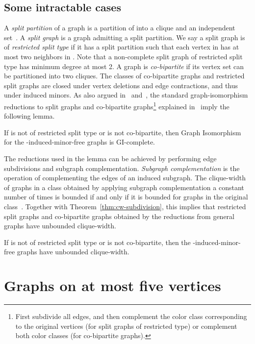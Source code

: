 \documentclass[envcountsame,envcountsect,11pt,a4paper]{llncs}
\begin{document}
\subsection{Some intractable cases}\label{subsec:intractable:cases}
A \emph{split partition}  of a graph 
is a partition of  into a clique  and an independent set~. A \emph{split graph} is a graph admitting a split partition.
We say a split graph is of \emph{restricted split type} if it has a split partition 
such that each vertex in  has at most two neighbors in .
Note that a non-complete split graph of restricted split type has minimum degree at most 2.
A graph is \emph{co-bipartite} if its vertex set can be partitioned into two cliques.
The classes of co-bipartite graphs and restricted split graphs are closed under vertex deletions and edge contractions, and thus under induced minors.
As also argued in~\cite{Ponomarenko88} and~\cite{DBLP:conf/wg/KratschS12},
the standard graph-isomorphism reductions to split graphs and co-bipartite graphs\footnote{First subdivide all edges, and then complement the color class corresponding to the original vertices (for split graphs of restricted type)
or complement both color classes (for co-bipartite graphs).}
explained in~\cite{BoothColbourn1979} imply the following lemma.
\begin{lemma}
\label{lem:type1split_cobipartite}
If  is not of restricted split type or  is not co-bipartite,
then {\sc Graph Isomorphism} for the -induced-minor-free graphs is GI-complete.
\end{lemma}
The reductions used in the lemma can be achieved by performing edge subdivisions and subgraph complementation.
\emph{Subgraph complementation} is the operation of complementing the edges of an induced subgraph.
The clique-width of graphs in a class obtained by applying subgraph complementation a constant number of times
is bounded if and only if it is bounded for graphs in the original class~\cite{KaminskiLozinMilanic2009}.
Together with Theorem~\ref{thm:cw-subdivision}, this implies that restricted split graphs and co-bipartite graphs obtained by the reductions from general graphs have unbounded clique-width.
\begin{corollary}
\label{lem:type1split_cobipartite_cw}
If  is not of restricted split type or  is not co-bipartite,
then the -induced-minor-free graphs have unbounded clique-width.
\end{corollary}




\section{Graphs on at most five vertices}
\label{sec:complicated}
\end{document}
